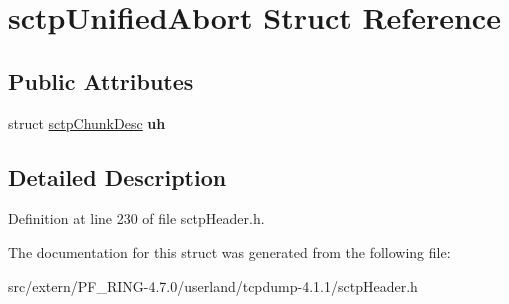 \hypertarget{structsctp_unified_abort}{
\section{sctpUnifiedAbort Struct Reference}
\label{structsctp_unified_abort}
}
\subsection*{Public Attributes}
\begin{DoxyCompactItemize}
\item 
\hypertarget{structsctp_unified_abort_a0faeee5c5b6c0937381b60c46721370c}{
struct \hyperlink{structsctp_chunk_desc}{sctpChunkDesc} {\bfseries uh}}
\label{structsctp_unified_abort_a0faeee5c5b6c0937381b60c46721370c}

\end{DoxyCompactItemize}


\subsection{Detailed Description}


Definition at line 230 of file sctpHeader.h.



The documentation for this struct was generated from the following file:\begin{DoxyCompactItemize}
\item 
src/extern/PF\_\-RING-\/4.7.0/userland/tcpdump-\/4.1.1/sctpHeader.h\end{DoxyCompactItemize}
